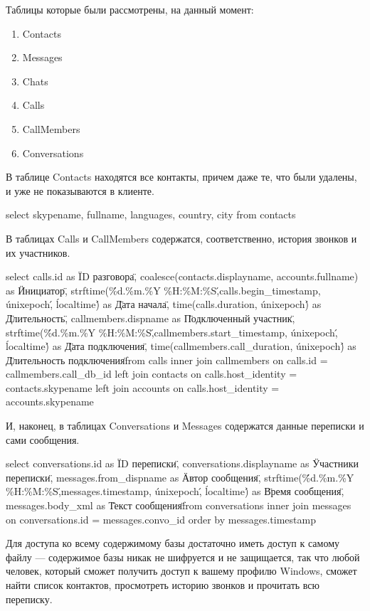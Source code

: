 Таблицы которые были рассмотрены, на данный момент:    
 \begin{enumerate}
\item Contacts
\item Messages
\item Chats
\item Calls
\item CallMembers
\item Conversations
\end{enumerate}

В таблице Contacts находятся все контакты, причем даже те, что были удалены, и уже не показываются в клиенте.

select skypename, 
       fullname, 
       languages, 
       country,
       city 
  from contacts



В таблицах Calls и CallMembers содержатся, соответственно, история звонков и их участников.

select calls.id as \"ID разговора\",
       coalesce(contacts.displayname, accounts.fullname) as \"Инициатор\",
       strftime(\'\%d.\%m.\%Y \%H:\%M:\%S\',calls.begin_timestamp, \'unixepoch\', \'localtime\') as \"Дата начала\",
       time(calls.duration, \'unixepoch\') as \"Длительность\",
       callmembers.dispname as \"Подключенный участник\",
       strftime(\'\%d.\%m.\%Y \%H:\%M:\%S\',callmembers.start_timestamp, \'unixepoch\', \'localtime\') as \"Дата подключения\",
       time(callmembers.call_duration, \'unixepoch\') as \"Длительность подключения\"
  from calls
       inner join callmembers on calls.id = callmembers.call_db_id
       left  join contacts on calls.host_identity = contacts.skypename
       left  join accounts on calls.host_identity = accounts.skypename



И, наконец, в таблицах Conversations и Messages содержатся данные переписки и сами сообщения.

select conversations.id as \"ID переписки\", 
       conversations.displayname as \"Участники переписки\", 
       messages.from_dispname as \"Автор сообщения\",  
       strftime(\'\%d.\%m.\%Y \%H:\%M:\%S\',messages.timestamp, \'unixepoch\', \'localtime\') as \"Время сообщения\", 
       messages.body_xml as \"Текст сообщения\"
  from conversations
       inner join messages on conversations.id = messages.convo_id
order by messages.timestamp



Для доступа ко всему содержимому базы достаточно иметь доступ к самому файлу — содержимое базы никак не шифруется и не защищается, так что любой человек, который сможет получить доступ к вашему профилю Windows, сможет найти список контактов, просмотреть историю звонков и прочитать всю переписку. 


